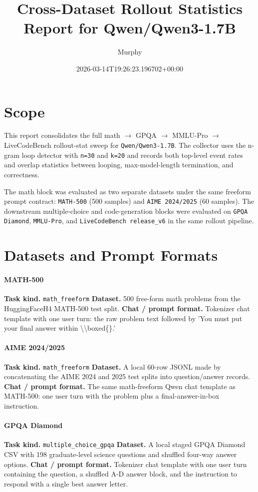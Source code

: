 \documentclass[11pt]{article}
\title{Cross-Dataset Rollout Statistics Report for Qwen/Qwen3-1.7B}
\author{Murphy}
\date{2026-03-14T19:26:23.196702+00:00}
\begin{document}
\maketitle

\section*{Scope}
This report consolidates the full math $\rightarrow$ GPQA $\rightarrow$ MMLU-Pro $\rightarrow$ LiveCodeBench rollout-stat sweep for \texttt{Qwen/Qwen3-1.7B}. The collector uses the n-gram loop detector with \texttt{n=30} and \texttt{k=20} and records both top-level event rates and overlap statistics between looping, max-model-length termination, and correctness.

The math block was evaluated as two separate datasets under the same freeform prompt contract: \texttt{MATH-500} (500 samples) and \texttt{AIME 2024/2025} (60 samples). The downstream multiple-choice and code-generation blocks were evaluated on \texttt{GPQA Diamond}, \texttt{MMLU-Pro}, and \texttt{LiveCodeBench release\_v6} in the same rollout pipeline.

\section*{Datasets and Prompt Formats}
\paragraph{MATH-500}
\textbf{Task kind.} \texttt{math\_freeform}
\textbf{Dataset.} 500 free-form math problems from the HuggingFaceH4 MATH-500 test split.
\textbf{Chat / prompt format.} Tokenizer chat template with one user turn: the raw problem text followed by 'You must put your final answer within \textbackslash{}\textbackslash{}boxed\{\}.'

\paragraph{AIME 2024/2025}
\textbf{Task kind.} \texttt{math\_freeform}
\textbf{Dataset.} A local 60-row JSONL made by concatenating the AIME 2024 and 2025 test splits into question/answer records.
\textbf{Chat / prompt format.} The same math-freeform Qwen chat template as MATH-500: one user turn with the problem plus a final-answer-in-box instruction.

\paragraph{GPQA Diamond}
\textbf{Task kind.} \texttt{multiple\_choice\_gpqa}
\textbf{Dataset.} A local staged GPQA Diamond CSV with 198 graduate-level science questions and shuffled four-way answer options.
\textbf{Chat / prompt format.} Tokenizer chat template with one user turn containing the question, a shuffled A-D answer block, and the instruction to respond with a single best answer letter.
\end{document}
